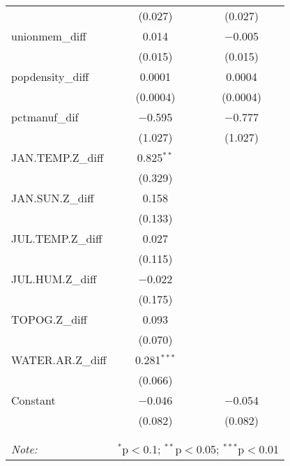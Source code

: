 \begin{table}[!htbp]
\begin{tabular}{@{\extracolsep{5pt}}lcc}
  & (0.027) & (0.027) \\ 
  unionmem\_diff & 0.014 & $-$0.005 \\ 
  & (0.015) & (0.015) \\ 
  popdensity\_diff & 0.0001 & 0.0004 \\ 
  & (0.0004) & (0.0004) \\ 
  pctmanuf\_dif & $-$0.595 & $-$0.777 \\ 
  & (1.027) & (1.027) \\ 
  JAN.TEMP.Z\_diff & 0.825$^{**}$ &  \\ 
  & (0.329) &  \\ 
  JAN.SUN.Z\_diff & 0.158 &  \\ 
  & (0.133) &  \\ 
  JUL.TEMP.Z\_diff & 0.027 &  \\ 
  & (0.115) &  \\ 
  JUL.HUM.Z\_diff & $-$0.022 &  \\ 
  & (0.175) &  \\ 
  TOPOG.Z\_diff & 0.093 &  \\ 
  & (0.070) &  \\ 
  WATER.AR.Z\_diff & 0.281$^{***}$ &  \\ 
  & (0.066) &  \\ 
  Constant & $-$0.046 & $-$0.054 \\ 
  & (0.082) & (0.082) \\ 
 \hline \\[-1.8ex] 
\hline 
\hline \\[-1.8ex] 
\textit{Note:}  & \multicolumn{2}{r}{$^{*}$p$<$0.1; $^{**}$p$<$0.05; $^{***}$p$<$0.01} \\ 
\end{tabular} 
\end{table} 
